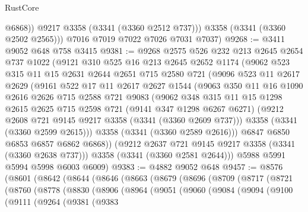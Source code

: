 \begin{lexlean}{RustCore}
\begin{coremodule}
              @6868))
          @9217
          @3358
          (@3341 (@3360 @2512 @737)))
        @3358
        (@3341 (@3360 @2502 @2565)))
      @7016
      @7019
      @7022
      @7026
      @7031
      @7037)
@9268 := @3411 @9052 @648 @758 @3415
@9381 := @9268
    @2575
    @526
    @232
    @213
    @2645
    @2654
    @737
    @1022
    (@9121
      @310
      @525
      @16
      @213
      @2645
      @2652
      @1174
      (@9062
        @523
        @315
        @11
        @15
        @2631
        @2644
        @2651
        @715
        @2580
        @721
        (@9096
          @523
          @11
          @2617
          @2629
          (@9161
            @522
            @17
            @11
            @2617
            @2627
            @1544
            (@9063
              @350
              @11
              @16
              @1090
              @2616
              @2626
              @715
              @2588
              @721
              @9083
              (@9062
                @348
                @315
                @11
                @15
                @1298
                @2615
                @2625
                @715
                @2598
                @721
                (@9141 @347 @1298 @6267 @6271)
                (@9212 @2608 @721 @9145 @9217 @3358 (@3341 (@3360 @2609 @737)))
                @3358
                (@3341 (@3360 @2599 @2615)))
              @3358
              (@3341 (@3360 @2589 @2616)))
            @6847
            @6850
            @6853
            @6857
            @6862
            @6868))
        (@9212 @2637 @721 @9145 @9217 @3358 (@3341 (@3360 @2638 @737)))
        @3358
        (@3341 (@3360 @2581 @2644)))
      @5988
      @5991
      @5994
      @5998
      @6003
      @6009)
@9383 := @4882 @9052 @648
@9457 := @8576
    (@8601
      (@8642
        (@8644
          (@8646
            (@8663
              (@8679
                (@8696
                  (@8709
                    (@8717
                      (@8721
                        (@8760
                          (@8778
                            (@8830
                              (@8906
                                (@8964
                                  (@9051
                                    (@9060
                                      (@9084
                                        (@9094
                                          (@9100
                                            (@9111
                                              (@9264
                                                (@9381
                                                  (@9383

\end{coremodule}
\end{lexlean}
